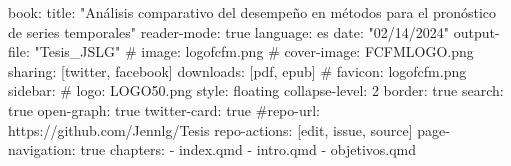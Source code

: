 \documentclass[
  letterpaper,
]{krantz}
\makeatletter
\newenvironment{Shaded}{\begin{snugshade}}{\end{snugshade}}
\newcommand{\AttributeTok}[1]{\textcolor[rgb]{0.40,0.45,0.13}{#1}}
\newcommand{\CharTok}[1]{\textcolor[rgb]{0.13,0.47,0.30}{#1}}
\newcommand{\CommentTok}[1]{\textcolor[rgb]{0.37,0.37,0.37}{#1}}
\newcommand{\DecValTok}[1]{\textcolor[rgb]{0.68,0.00,0.00}{#1}}
\newcommand{\FunctionTok}[1]{\textcolor[rgb]{0.28,0.35,0.67}{#1}}
\newcommand{\KeywordTok}[1]{\textcolor[rgb]{0.00,0.23,0.31}{#1}}
\newcommand{\StringTok}[1]{\textcolor[rgb]{0.13,0.47,0.30}{#1}}
\newenvironment{kframe}{%
\medskip{}
\setlength{\fboxsep}{.8em}
 \def\at@end@of@kframe{}%
 \ifinner\ifhmode%
  \def\at@end@of@kframe{\end{minipage}}%
  \begin{minipage}{\columnwidth}%
 \fi\fi%
 \def\FrameCommand##1{\hskip\@totalleftmargin \hskip-\fboxsep
 \colorbox{shadecolor}{##1}\hskip-\fboxsep
     \hskip-\linewidth \hskip-\@totalleftmargin \hskip\columnwidth}%
 \MakeFramed {\advance\hsize-\width
   \@totalleftmargin\z@ \linewidth\hsize
   \@setminipage}}%
 {\par\unskip\endMakeFramed%
 \at@end@of@kframe}
\renewenvironment{Shaded}{\begin{kframe}}{\end{kframe}}
\theoremstyle{plain}
\theoremstyle{definition}
\theoremstyle{definition}
\theoremstyle{remark}
\makeatother
\begin{document}
\begin{codelisting}
\begin{Shaded}
\begin{Highlighting}[]
\FunctionTok{book}\KeywordTok{:}
\AttributeTok{  }\FunctionTok{title}\KeywordTok{:}\AttributeTok{ }\StringTok{"Análisis comparativo del desempeño en métodos para el pronóstico de series temporales"}
\AttributeTok{  }\FunctionTok{reader{-}mode}\KeywordTok{:}\AttributeTok{ }\CharTok{true}
\AttributeTok{  }\FunctionTok{language}\KeywordTok{:}\AttributeTok{ es}
\AttributeTok{  }\FunctionTok{date}\KeywordTok{:}\AttributeTok{ }\StringTok{"02/14/2024"}
\AttributeTok{  }\FunctionTok{output{-}file}\KeywordTok{:}\AttributeTok{ }\StringTok{"Tesis\_JSLG"}
\CommentTok{  \# image: logofcfm.png}
\CommentTok{  \# cover{-}image: FCFMLOGO.png}
\AttributeTok{  }\FunctionTok{sharing}\KeywordTok{:}\AttributeTok{ }\KeywordTok{[}\AttributeTok{twitter}\KeywordTok{,}\AttributeTok{ facebook}\KeywordTok{]}
\AttributeTok{  }\FunctionTok{downloads}\KeywordTok{:}\AttributeTok{ }\KeywordTok{[}\AttributeTok{pdf}\KeywordTok{,}\AttributeTok{ epub}\KeywordTok{]}
\CommentTok{  \# favicon: logofcfm.png}
\AttributeTok{  }\FunctionTok{sidebar}\KeywordTok{:}
\CommentTok{  \#  logo: LOGO50.png}
\AttributeTok{    }\FunctionTok{style}\KeywordTok{:}\AttributeTok{ floating}
\AttributeTok{    }\FunctionTok{collapse{-}level}\KeywordTok{:}\AttributeTok{ }\DecValTok{2}
\AttributeTok{    }\FunctionTok{border}\KeywordTok{:}\AttributeTok{ }\CharTok{true}
\AttributeTok{    }\FunctionTok{search}\KeywordTok{:}\AttributeTok{ }\CharTok{true}
\AttributeTok{  }\FunctionTok{open{-}graph}\KeywordTok{:}\AttributeTok{ }\CharTok{true}
\AttributeTok{  }\FunctionTok{twitter{-}card}\KeywordTok{:}\AttributeTok{ }\CharTok{true}
\CommentTok{  \#repo{-}url: https://github.com/Jennlg/Tesis}
\AttributeTok{  }\FunctionTok{repo{-}actions}\KeywordTok{:}\AttributeTok{ }\KeywordTok{[}\AttributeTok{edit}\KeywordTok{,}\AttributeTok{ issue}\KeywordTok{,}\AttributeTok{ source}\KeywordTok{]}
\AttributeTok{  }\FunctionTok{page{-}navigation}\KeywordTok{:}\AttributeTok{ }\CharTok{true}
\AttributeTok{  }\FunctionTok{chapters}\KeywordTok{:}
\AttributeTok{    }\KeywordTok{{-}}\AttributeTok{ index.qmd}
\AttributeTok{    }\KeywordTok{{-}}\AttributeTok{ intro.qmd}
\AttributeTok{    }\KeywordTok{{-}}\AttributeTok{ objetivos.qmd}


\end{Highlighting}
\end{Shaded}
\end{codelisting}
\end{document}
